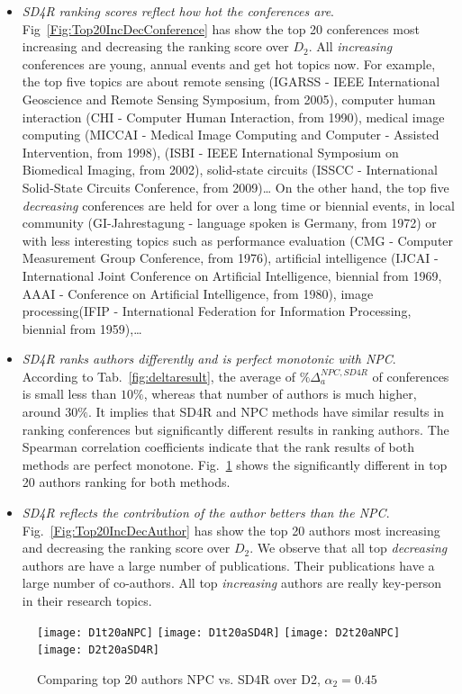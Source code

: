 \documentclass[10pt,leqno,twoside]{article}
\begin{document}
\begin{itemize}
\item \textit{SD4R ranking scores reflect how hot the conferences are}. Fig~\ref{Fig:Top20IncDecConference} has show the top 20 conferences most increasing and decreasing the ranking score over $D_2$. All \textit{increasing} conferences are young, annual events and get hot topics now. For example, the top five topics are about remote sensing (IGARSS - IEEE International Geoscience and Remote Sensing Symposium, from 2005), computer human interaction (CHI - Computer Human Interaction, from 1990), medical image computing (MICCAI - Medical Image Computing and Computer - Assisted Intervention, from 1998), (ISBI - IEEE International Symposium on Biomedical Imaging, from 2002), solid-state circuits (ISSCC - International Solid-State Circuits Conference, from 2009)\ldots
On the other hand, the top five \textit{decreasing} conferences are held for over a long time or biennial events, in local community (GI-Jahrestagung - language spoken is Germany, from 1972) or with less interesting topics such as performance evaluation (CMG - Computer Measurement Group Conference, from 1976), artificial intelligence (IJCAI -  International Joint Conference on Artificial Intelligence, biennial from 1969, AAAI - Conference on Artificial Intelligence, from 1980), image processing(IFIP - International Federation for Information Processing, biennial from 1959),\ldots
%

\item\textit{SD4R ranks authors differently and is perfect monotonic with NPC}.
\\
According to Tab.~\ref{fig:deltaresult}, the average of $\%\Delta^{NPC,SD4R}_a$ of conferences is small less than $10\%$, whereas that number of authors is much higher, around $30\%$. It implies that SD4R and NPC methods have similar results in ranking conferences but significantly different results in ranking authors. The Spearman correlation coefficients indicate that the rank results of both methods are perfect monotone. Fig.~\ref{Fig:Top20Author} shows the significantly different in top 20 authors ranking for both methods.
\item\textit{SD4R reflects the contribution of the author betters than the NPC}. Fig.~\ref{Fig:Top20IncDecAuthor} has show the top 20 authors most increasing and decreasing the ranking score over $D_2$. We observe that all top \textit{decreasing} authors are have a large number of publications. Their publications have a large number of co-authors. All top \textit{increasing} authors are really key-person in their research topics.
\end{itemize}
%
\begin{figure} %
	\caption{Comparing top 20 authors NPC vs. SD4R over D2, $\alpha_2=0.45$}
	\label{Fig:Top20Author}
    \centering
    \texttt{[image: D1t20aNPC]}
    \texttt{[image: D1t20aSD4R]}
    \texttt{[image: D2t20aNPC]}
    \texttt{[image: D2t20aSD4R]}
\end{figure}
%
\end{document}
